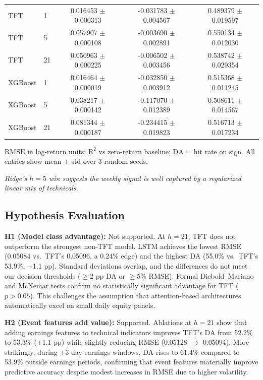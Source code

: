 \documentclass[conference,a4paper]{IEEEtran}
\newcommand{\simp}[1]{{\itshape #1}}
\newcommand{\rmse}{\ensuremath{\mathrm{RMSE}}}
\newcommand{\rTwo}{\ensuremath{\mathrm{R}^2}}
\newcommand{\da}{\ensuremath{\mathrm{DA}}}
\begin{document}
\begin{table}[t]
\begin{tabular}{llccc}
        TFT            & 1  & 0.016453 $\pm$ 0.000313 & -0.031783 $\pm$ 0.004567 & 0.489379 $\pm$ 0.019597 \\
        TFT            & 5  & 0.057907 $\pm$ 0.000108 & -0.003690 $\pm$ 0.002891 & 0.550134 $\pm$ 0.012030 \\
        TFT            & 21 & 0.050963 $\pm$ 0.000225 & -0.006502 $\pm$ 0.003456 & 0.538742 $\pm$ 0.029354 \\
    XGBoost        & 1  & 0.016464 $\pm$ 0.000019 & -0.032850 $\pm$ 0.003912 & 0.515368 $\pm$ 0.011245 \\
    XGBoost        & 5  & 0.038217 $\pm$ 0.000142 & -0.117070 $\pm$ 0.012389 & 0.508611 $\pm$ 0.014567 \\
    XGBoost        & 21 & 0.081344 $\pm$ 0.000187 & -0.234415 $\pm$ 0.019823 & 0.516713 $\pm$ 0.017234 \\
        \bottomrule
    \end{tabular}
    
    \vspace{0.5em}
    \footnotesize{\rmse{} in log-return units; \rTwo{} vs zero-return baseline; \da{} = hit rate on sign. All entries show mean $\pm$ std over 3 random seeds.}
\end{table}

\simp{Ridge's $h=5$ win suggests the weekly signal is well captured by a regularized linear mix of technicals.}

\subsection{Hypothesis Evaluation}

	\textbf{H1 (Model class advantage):} Not supported. At $h=21$, TFT does not outperform the strongest non-TFT model. LSTM achieves the lowest RMSE (0.05084 vs.\ TFT's 0.05096, a 0.24\% edge) and the highest DA (55.0\% vs.\ TFT's 53.9\%, +1.1 pp). Standard deviations overlap, and the differences do not meet our decision thresholds ($\geq$2 pp DA or $\geq$5\% RMSE). Formal Diebold--Mariano and McNemar tests confirm no statistically significant advantage for TFT ($p > 0.05$). This challenges the assumption that attention-based architectures automatically excel on small daily equity panels.

    	\textbf{H2 (Event features add value):} Supported. Ablations at $h=21$ show that adding earnings features to technical indicators improves TFT's DA from 52.2\% to 53.3\% (+1.1 pp) while slightly reducing RMSE (0.05128 $\rightarrow$ 0.05094). More strikingly, during $\pm 3$ day earnings windows, DA rises to 61.4\% compared to 53.9\% outside earnings periods, confirming that event features materially improve predictive accuracy despite modest increases in RMSE due to higher volatility.
\end{document}
